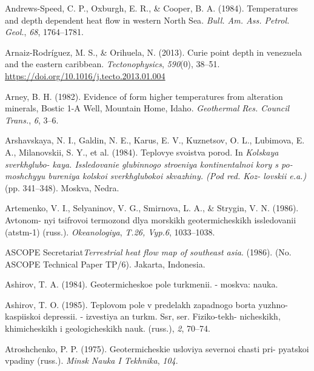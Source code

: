 \documentclass[draft,linenumbers]{agujournal2018}
\begin{document}
\leavevmode{}%
Andrews-Speed, C. P., Oxburgh, E. R., \& Cooper, B. A. (1984).
Temperatures and depth dependent heat flow in western {North Sea}.
\emph{Bull. Am. Ass. Petrol. Geol.}, \emph{68}, 1764--1781.

\leavevmode{}%
Arnaiz-Rodríguez, M. S., \& Orihuela, N. (2013). Curie point depth in
venezuela and the eastern caribbean. \emph{Tectonophysics},
\emph{590}(0), 38--51. \url{https://doi.org/10.1016/j.tecto.2013.01.004}

\leavevmode{}%
Arney, B. H. (1982). Evidence of form higher temperatures from
alteration minerals, {Bostic 1-A Well, Mountain Home, Idaho}.
\emph{Geothermal Res. Council Trans.}, \emph{6}, 3--6.

\leavevmode{}%
Arshavskaya, N. I., Galdin, N. E., Karus, E. V., Kuznetsov, O. L.,
Lubimova, E. A., Milanovskii, S. Y., et al. (1984). Teplovye svoistva
porod. In \emph{Kolskaya sverkhglubo- kaya. Issledovanie glubinnogo
stroeniya kontinentalnoi kory s po- moshchyyu bureniya kolskoi
sverkhglubokoi skvazhiny. (Pod red. Koz- lovskii e.a.)} (pp. 341--348).
Moskva, Nedra.

\leavevmode{}%
Artemenko, V. I., Selyaninov, V. G., Smirnova, L. A., \& Strygin, V. N.
(1986). Avtonom- nyi tsifrovoi termozond dlya morskikh geotermicheskikh
issledovanii (atstm-1) (russ.). \emph{Okeanologiya}, \emph{T.26, Vyp.6},
1033--1038.

\leavevmode{}%
ASCOPE Secretariat\emph{Terrestrial heat flow map of southeast asia}.
(1986). (No. ASCOPE Technical Paper TP/6). Jakarta, Indonesia.

\leavevmode{}%
Ashirov, T. A. (1984). Geotermicheskoe pole turkmenii. - moskva: nauka.

\leavevmode{}%
Ashirov, T. O. (1985). Teplovom pole v predelakh zapadnogo borta yuzhno-
kaspiiskoi depressii. - izvestiya an turkm. Ssr, ser. Fiziko-tekh-
nicheskikh, khimicheskikh i geologicheskikh nauk. (russ.), \emph{2},
70--74.

\leavevmode{}%
Atroshchenko, P. P. (1975). Geotermicheskie usloviya severnoi chasti
pri- pyatskoi vpadiny (russ.). \emph{Minsk Nauka I Tekhnika},
\emph{104}.
\end{document}
